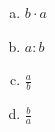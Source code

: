 \documentclass[a4paper,14pt]{article}
\begin{document}
\begin{multicols}{2}
\begin{enumerate}
\begin{enumerate}[a)]
    			\item $b \cdot a$
    			\item $a : b$
    			\item $\frac{a}{b}$
    			\item $\frac{b}{a}$
    		\end{enumerate}
    	\end{enumerate}
    $~$ \\ $~$ \\ $~$ \\ $~$ \\ $~$ \\ $~$ \\ $~$ \\ $~$ \\ $~$ \\ $~$ \\ $~$ \\ $~$ \\ $~$ \\ $~$ \\ $~$ \\ $~$ \\ $~$ \\ $~$ \\ $~$ \\ $~$ \\ $~$ \\ $~$ \\ $~$ \\ $~$ \\ $~$
	\end{multicols}
\end{document}
